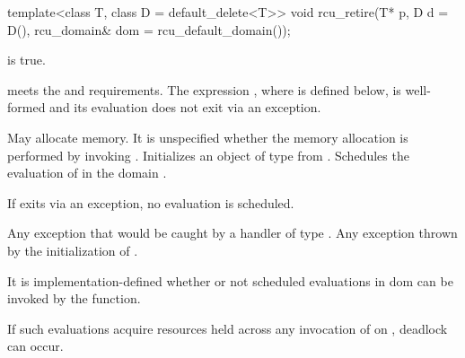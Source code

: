 \begin{itemdecl}
template<class T, class D = default_delete<T>>
void rcu_retire(T* p, D d = D(), rcu_domain& dom = rcu_default_domain());
\end{itemdecl}

\begin{itemdescr}

\mandates
{} is true.

\expects
{} meets the  and
 requirements.
The expression , where  is defined below, is
well-formed and its evaluation does not exit via an exception.

\effects
May allocate memory.
It is unspecified whether the memory allocation is performed by
invoking  .
Initializes an object  of type  from
.
Schedules the evaluation of  in the domain
.
\begin{note}
If  exits via an exception, no evaluation
is scheduled.\end{note}

\throws
Any exception that would be caught by a handler of type
.
Any exception thrown by the initialization of .

\remarks
It is implementation-defined whether or not scheduled
evaluations in dom can be invoked by the 
function.
\begin{note}
If such evaluations acquire resources held across any invocation
of  on , deadlock can occur.\end{note}

\end{itemdescr}
